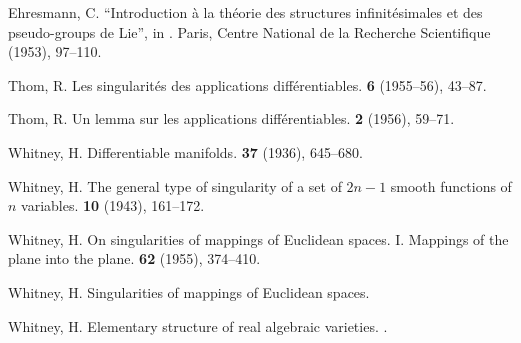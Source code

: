 \documentclass{article}
\theoremstyle{plain}
\theoremstyle{definition}
\begin{document}
\begin{thebibliography}{1}

  {\sc Ehresmann, C.}
  \newblock ``Introduction \`{a} la th\'{e}orie des structures infinit\'{e}simales et des pseudo-groups de Lie'', in
  .
  \newblock Paris, Centre National de la Recherche Scientifique (1953), 97--110.

  {\sc Thom, R.}
  \newblock Les singularit\'{e}s des applications diff\'{e}rentiables.
   \textbf{6} (1955--56), 43--87.

  {\sc Thom, R.}
  \newblock Un lemma sur les applications diff\'{e}rentiables.
   \textbf{2} (1956), 59--71.

  {\sc Whitney, H.}
  \newblock Differentiable manifolds.
   \textbf{37} (1936), 645--680.

  {\sc Whitney, H.}
  \newblock The general type of singularity of a set of $2n-1$ smooth functions of $n$ variables.
   \textbf{10} (1943), 161--172.

  {\sc Whitney, H.}
  \newblock On singularities of mappings of Euclidean spaces. I. Mappings of the plane into the plane.
   \textbf{62} (1955), 374--410.

  {\sc Whitney, H.}
  \newblock Singularities of mappings of Euclidean spaces.

  {\sc Whitney, H.}
  \newblock Elementary structure of real algebraic varieties.
  .

\end{thebibliography}
\end{document}
